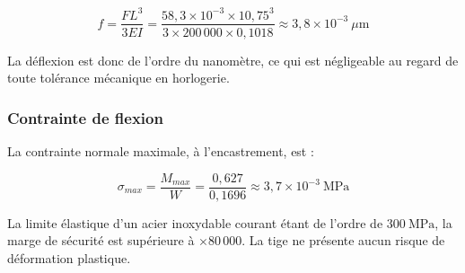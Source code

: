 \[
  f = \frac{F L^3}{3EI}
  = \frac{58{,}3 \times 10^{-3} \times 10{,}75^3}{3 \times 200\,000 \times 0{,}1018}
  \approx 3{,}8 \times 10^{-3}\ \mu\text{m}
\]

La déflexion est donc de l'ordre du nanomètre, ce qui est négligeable au regard de toute tolérance mécanique en horlogerie.

\subsubsection{Contrainte de flexion}

La contrainte normale maximale, à l'encastrement, est :

\[
  \sigma_{max} = \frac{M_{max}}{W} = \frac{0{,}627}{0{,}1696} \approx 3{,}7 \times 10^{-3}\ \text{MPa}
\]

La limite élastique d'un acier inoxydable courant étant de l'ordre de $300\ \text{MPa}$, la marge de sécurité est supérieure à $\times 80\,000$. La tige ne présente aucun risque de déformation plastique.
